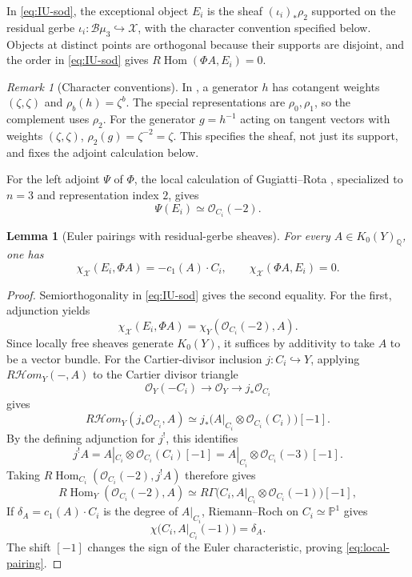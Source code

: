 \documentclass[11pt]{article}
\theoremstyle{plain}
\newtheorem{lemma}[theorem]{Lemma}
\theoremstyle{definition}
\theoremstyle{remark}
\newtheorem{remark}[theorem]{Remark}
\newcommand{\cX}{\mathcal X}
\newcommand{\Q}{\mathbb Q}
\newcommand{\Pj}{\mathbb P}
\newcommand{\1}{\mathbf 1}
\begin{document}
In \eqref{eq:IU-sod}, the exceptional object $E_i$ is the sheaf $(\iota_i)_*\rho_2$ supported on the residual gerbe $\iota_i:\mathcal B\mu_3\hookrightarrow\cX$, with the character convention specified below.  Objects at distinct points are orthogonal because their supports are disjoint, and the order in \eqref{eq:IU-sod} gives $R\!\operatorname{Hom}(\Phi A,E_i)=0$.

\begin{remark}[Character conventions]\label{rem:character-conventions}
In \cite[Section 2.3 and Example 2.7]{GR}, a generator $h$ has cotangent weights $(\zeta,\zeta)$ and $\rho_b(h)=\zeta^b$.  The special representations are $\rho_0,\rho_1$, so the complement uses $\rho_2$.  For the generator $g=h^{-1}$ acting on tangent vectors with weights $(\zeta,\zeta)$, $\rho_2(g)=\zeta^{-2}=\zeta$.  This specifies the sheaf, not just its support, and fixes the adjoint calculation below.
\end{remark}

For the left adjoint $\Psi$ of $\Phi$, the local calculation of Gugiatti--Rota \cite[Example 3.5]{GR}, specialized to $n=3$ and representation index $2$, gives
\[
\Psi(E_i)\simeq\mathcal O_{C_i}(-2).
\]
\begin{lemma}[Euler pairings with residual-gerbe sheaves]\label{lem:local-pairing}
For every $A\in K_0(Y)_{\Q}$, one has
\begin{equation}\label{eq:local-pairing}
\chi_{\cX}(E_i,\Phi A)=-c_1(A)\cdot C_i,
\qquad
\chi_{\cX}(\Phi A,E_i)=0.
\end{equation}
\end{lemma}

\begin{proof}
Semiorthogonality in \eqref{eq:IU-sod} gives the second equality.  For the first, adjunction yields
\[
\chi_{\cX}(E_i,\Phi A)=\chi_Y(\mathcal O_{C_i}(-2),A).
\]
Since locally free sheaves generate $K_0(Y)$, it suffices by additivity to take $A$ to be a vector bundle.  For the Cartier-divisor inclusion $j:C_i\hookrightarrow Y$, applying $R\mathcal{H}om_Y(-,A)$ to the Cartier divisor triangle
\[
\mathcal O_Y(-C_i)\longrightarrow\mathcal O_Y\longrightarrow j_*\mathcal O_{C_i}
\]
gives
\[
R\mathcal{H}om_Y(j_*\mathcal O_{C_i},A)
\simeq j_*\bigl(A|_{C_i}\otimes\mathcal O_{C_i}(C_i)\bigr)[-1].
\]
By the defining adjunction for $j^!$, this identifies
\[
j^!A=A|_{C_i}\otimes\mathcal O_{C_i}(C_i)[-1]
=A|_{C_i}\otimes\mathcal O_{C_i}(-3)[-1].
\]
Taking $R\!\operatorname{Hom}_{C_i}(\mathcal O_{C_i}(-2),j^!A)$ therefore gives
\[
R\!\operatorname{Hom}_Y(\mathcal O_{C_i}(-2),A)
\simeq
R\Gamma\bigl(C_i,A|_{C_i}\otimes\mathcal O_{C_i}(-1)\bigr)[-1],
\]
If $\delta_A=c_1(A)\cdot C_i$ is the degree of $A|_{C_i}$, Riemann--Roch on $C_i\simeq\Pj^1$ gives
\[
\chi\bigl(C_i,A|_{C_i}(-1)\bigr)=\delta_A.
\]
The shift $[-1]$ changes the sign of the Euler characteristic, proving \eqref{eq:local-pairing}.
\end{proof}
\end{document}
